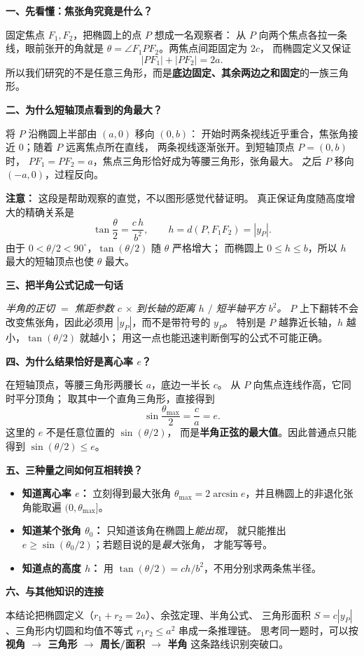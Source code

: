\begin{explanationbox}
\textbf{一、先看懂：焦张角究竟是什么？}

固定焦点 $F_1,F_2$，把椭圆上的点 $P$ 想成一名观察者：
从 $P$ 向两个焦点各拉一条线，眼前张开的角就是
$\theta=\angle F_1PF_2$。两焦点间距固定为 $2c$，
而椭圆定义又保证
\[
|PF_1|+|PF_2|=2a.
\]
所以我们研究的不是任意三角形，而是\textbf{底边固定、其余两边之和固定}的一族三角形。

\textbf{二、为什么短轴顶点看到的角最大？}

将 $P$ 沿椭圆上半部由 $(a,0)$ 移向 $(0,b)$：
开始时两条视线近乎重合，焦张角接近 $0$；随着 $P$ 远离焦点所在直线，
两条视线逐渐张开。到短轴顶点 $P=(0,b)$ 时，
$PF_1=PF_2=a$，焦点三角形恰好成为等腰三角形，张角最大。
之后 $P$ 移向 $(-a,0)$，过程反向。

\textbf{注意：} 这段是帮助观察的直觉，不以图形感觉代替证明。
真正保证角度随高度增大的精确关系是
\[
\boxed{\tan\frac\theta2=\frac{c\,h}{b^2}},
\qquad h=d(P,F_1F_2)=|y_P|.
\]
由于 $0<\theta/2<90^\circ$，$\tan(\theta/2)$ 随 $\theta$ 严格增大；
而椭圆上 $0\le h\le b$，所以 $h$ 最大的短轴顶点也使 $\theta$ 最大。

\textbf{三、把半角公式记成一句话}

\emph{半角的正切 $=$ 焦距参数 $c$ \(\times\) 到长轴的距离 $h$ \(/\) 短半轴平方 $b^2$。}
$P$ 上下翻转不会改变焦张角，因此必须用 $|y_P|$，而不是带符号的 $y_P$。
特别是 $P$ 越靠近长轴，$h$ 越小，$\tan(\theta/2)$ 就越小；
用这一点也能迅速判断倒写的公式不可能正确。

\textbf{四、为什么结果恰好是离心率 $e$？}

在短轴顶点，等腰三角形两腰长 $a$，底边一半长 $c$。
从 $P$ 向焦点连线作高，它同时平分顶角；
取其中一个直角三角形，直接得到
\[
\sin\frac{\theta_{\max}}2=\frac ca=e.
\]
这里的 $e$ 不是任意位置的 $\sin(\theta/2)$，
而是\textbf{半角正弦的最大值}。因此普通点只能得到
$\sin(\theta/2)\le e$。

\textbf{五、三种量之间如何互相转换？}
\begin{itemize}
  \item \textbf{知道离心率 $e$：} 立刻得到最大张角
  $\theta_{\max}=2\arcsin e$，并且椭圆上的非退化张角能取遍
  $(0,\theta_{\max}]$。
  \item \textbf{知道某个张角 $\theta_0$：} 只知道该角在椭圆上\emph{能出现}，
  就只能推出 $e\ge\sin(\theta_0/2)$；若题目说的是\emph{最大}张角，
  才能写等号。
  \item \textbf{知道点的高度 $h$：} 用
  $\tan(\theta/2)=ch/b^2$，不用分别求两条焦半径。
\end{itemize}

\textbf{六、与其他知识的连接}

本结论把椭圆定义（$r_1+r_2=2a$）、余弦定理、半角公式、
三角形面积 $S=c|y_P|$、三角形内切圆和均值不等式
$r_1r_2\le a^2$ 串成一条推理链。
思考同一题时，可以按\textbf{视角 $\rightarrow$ 三角形 $\rightarrow$ 周长/面积 $\rightarrow$ 半角}
这条路线识别突破口。
\end{explanationbox}
